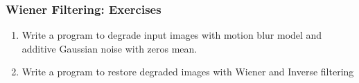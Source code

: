 \documentclass[english,11pt,table,handout]{beamer}
\begin{document}
\begin{frame}[fragile]
	\frametitle{Wiener Filtering: Exercises }
	
	\begin{exercise}
		\begin{enumerate}
			\item Write a program to degrade input images with motion blur model and additive Gaussian noise with zeros mean.
			\item Write a program to restore degraded images with Wiener and Inverse filtering
		\end{enumerate}
	\end{exercise}
\end{frame}


\end{document}
